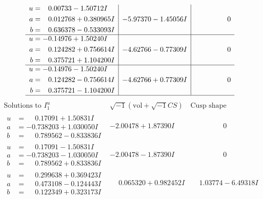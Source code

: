 \documentclass[1p]{elsarticle_modified}
\theoremstyle{definition}
\newcommand{\I}{\sqrt{-1}}
\begin{document}
$$\begin{array}{c|c|c}
\begin{aligned}
u &= \phantom{-}0.00733 - 1.50712 I \\
a &= \phantom{-}0.012768 + 0.380965 I \\
b &= \phantom{-}0.636378 - 0.533093 I\end{aligned}
 & -5.97370 - 1.45056 I & \phantom{-0.000000 } 0 \\ \hline\begin{aligned}
u &= -0.14976 + 1.50240 I \\
a &= \phantom{-}0.124282 + 0.756614 I \\
b &= \phantom{-}0.375721 + 1.104200 I\end{aligned}
 & -4.62766 - 0.77309 I & \phantom{-0.000000 } 0 \\ \hline\begin{aligned}
u &= -0.14976 - 1.50240 I \\
a &= \phantom{-}0.124282 - 0.756614 I \\
b &= \phantom{-}0.375721 - 1.104200 I\end{aligned}
 & -4.62766 + 0.77309 I & \phantom{-0.000000 } 0\\
 \hline 
 \end{array}$$\newpage$$\begin{array}{c|c|c}  
\text{Solutions to }I^u_{1}& \I (\text{vol} + \sqrt{-1}CS) & \text{Cusp shape}\\
 \hline 
\begin{aligned}
u &= \phantom{-}0.17091 + 1.50831 I \\
a &= -0.738203 + 1.030050 I \\
b &= \phantom{-}0.789562 - 0.833836 I\end{aligned}
 & -2.00478 + 1.87390 I & \phantom{-0.000000 } 0 \\ \hline\begin{aligned}
u &= \phantom{-}0.17091 - 1.50831 I \\
a &= -0.738203 - 1.030050 I \\
b &= \phantom{-}0.789562 + 0.833836 I\end{aligned}
 & -2.00478 - 1.87390 I & \phantom{-0.000000 } 0 \\ \hline\begin{aligned}
u &= \phantom{-}0.299638 + 0.369423 I \\
a &= \phantom{-}0.473108 - 0.124443 I \\
b &= \phantom{-}0.122349 + 0.323173 I\end{aligned}
 & \phantom{-}0.065320 + 0.982452 I & \phantom{-}1.03774 - 6.49318 I \\ \hline\begin{aligned}

\end{aligned}
\end{array}$$
\end{document}
